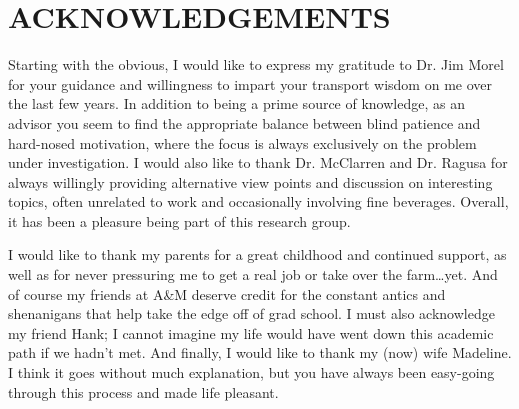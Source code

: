 %
%
%


\chapter*{ACKNOWLEDGEMENTS}

Starting with the obvious, I would like to express my gratitude to Dr. Jim Morel for your guidance and 
willingness to impart your transport wisdom on me over the last few years.  In addition to being a prime source of
knowledge, as an advisor you seem to find the appropriate balance between blind patience and hard-nosed
motivation, where the focus is always exclusively on the problem under investigation.
 I would also like to thank Dr. McClarren and Dr. Ragusa for always willingly providing
alternative view points and discussion on interesting topics, often unrelated to work and
occasionally involving fine beverages. Overall, it has been a pleasure being part of this research group. 

 I would like to thank my parents for a great childhood and continued support, as well
as for never pressuring me to get a real job or take over the farm\ldots yet.  And of course my friends
at A\&M deserve credit for the constant antics and shenanigans that help take the edge off of grad
school.  I must also acknowledge my friend Hank; I cannot imagine my life would have
went down this academic path if we hadn't met.  And finally, I would like to thank my (now) wife Madeline.  I think it goes without much
explanation, but you have always been easy-going through this process and made life pleasant.

